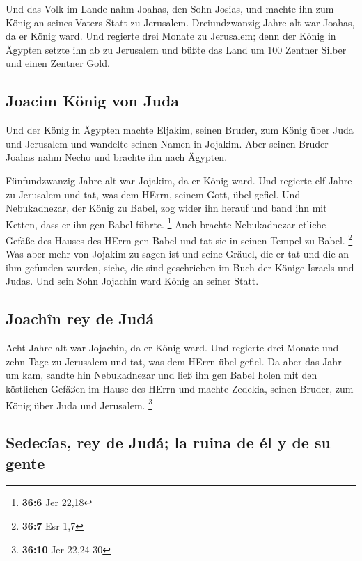  Und das Volk im Lande nahm Joahas, den Sohn Josias, und
machte ihn zum König an seines Vaters Statt zu Jerusalem. 
Dreiundzwanzig Jahre alt war Joahas, da er König ward. Und regierte drei
Monate zu Jerusalem;  denn der König in Ägypten setzte ihn
ab zu Jerusalem und büßte das Land um 100 Zentner Silber und einen
Zentner Gold.

\hypertarget{joacim-kuxf6nig-von-juda}{%
\subsection{Joacim König von Juda}\label{joacim-kuxf6nig-von-juda}}

 Und der König in Ägypten machte Eljakim, seinen Bruder,
zum König über Juda und Jerusalem und wandelte seinen Namen in Jojakim.
Aber seinen Bruder Joahas nahm Necho und brachte ihn nach Ägypten.

 Fünfundzwanzig Jahre alt war Jojakim, da er König ward.
Und regierte elf Jahre zu Jerusalem und tat, was dem HErrn, seinem Gott,
übel gefiel.  Und Nebukadnezar, der König zu Babel, zog
wider ihn herauf und band ihn mit Ketten, dass er ihn gen Babel führte.
\footnote{\textbf{36:6} Jer 22,18}  Auch brachte
Nebukadnezar etliche Gefäße des Hauses des HErrn gen Babel und tat sie
in seinen Tempel zu Babel. \footnote{\textbf{36:7} Esr 1,7}
 Was aber mehr von Jojakim zu sagen ist und seine Gräuel,
die er tat und die an ihm gefunden wurden, siehe, die sind geschrieben
im Buch der Könige Israels und Judas. Und sein Sohn Jojachin ward König
an seiner Statt.

\hypertarget{joachuxeen-rey-de-juduxe1}{%
\subsection{Joachîn rey de Judá}\label{joachuxeen-rey-de-juduxe1}}

 Acht Jahre alt war Jojachin, da er König ward. Und
regierte drei Monate und zehn Tage zu Jerusalem und tat, was dem HErrn
übel gefiel.  Da aber das Jahr um kam, sandte hin
Nebukadnezar und ließ ihn gen Babel holen mit den köstlichen Gefäßen im
Hause des HErrn und machte Zedekia, seinen Bruder, zum König über Juda
und Jerusalem. \footnote{\textbf{36:10} Jer 22,24-30}

\hypertarget{sedecuxedas-rey-de-juduxe1-la-ruina-de-uxe9l-y-de-su-gente}{%
\subsection{Sedecías, rey de Judá; la ruina de él y de su
gente}\label{sedecuxedas-rey-de-juduxe1-la-ruina-de-uxe9l-y-de-su-gente}}

